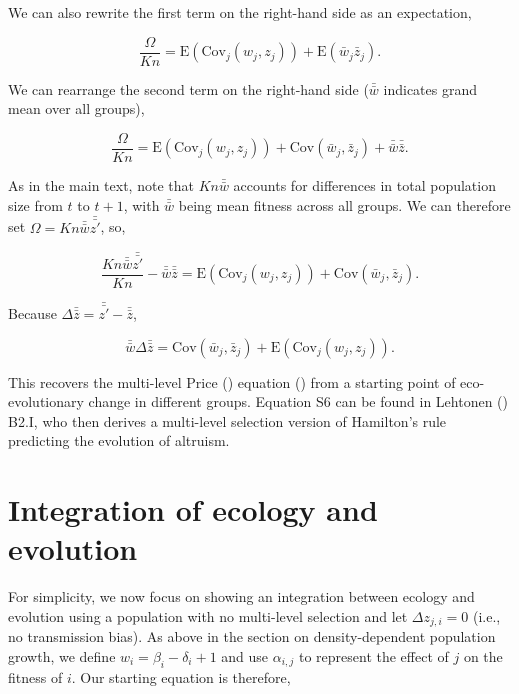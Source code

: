 \documentclass[
]{article}
\begin{document}
We can also rewrite the first term on the right-hand side as an
expectation,

\[\frac{\Omega}{K n} = \mathrm{E}\left(\mathrm{Cov}_{j}\left(w_{j}, z_{j}\right)\right) + \mathrm{E}\left(\bar{w}_{j} \bar{z}_{j} \right).\]

We can rearrange the second term on the right-hand side
(\(\bar{\bar{w}}\) indicates grand mean over all groups),

\[\frac{\Omega}{K n} = \mathrm{E}\left(\mathrm{Cov}_{j}\left(w_{j}, z_{j}\right)\right) +  \mathrm{Cov}\left(\bar{w}_{j}, \bar{z}_{j} \right) + \bar{\bar{w}}\bar{\bar{z}}.\]

As in the main text, note that \(Kn\bar{\bar{w}}\) accounts for
differences in total population size from \(t\) to \(t+1\), with
\(\bar{\bar{w}}\) being mean fitness across all groups. We can therefore
set \(\Omega = Kn\bar{\bar{w}}\bar{\bar{z'}}\), so,

\[\frac{Kn\bar{\bar{w}}\bar{\bar{z'}}}{K n} - \bar{\bar{w}}\bar{\bar{z}} = \mathrm{E}\left(\mathrm{Cov}_{j}\left(w_{j}, z_{j}\right)\right) +  \mathrm{Cov}\left(\bar{w}_{j}, \bar{z}_{j} \right).\]

Because \(\Delta \bar{\bar{z}} = \bar{\bar{z'}} - \bar{\bar{z}}\),

\[\bar{\bar{w}}\Delta \bar{\bar{z}} = \mathrm{Cov}\left(\bar{w}_{j}, \bar{z}_{j} \right) + \mathrm{E}\left(\mathrm{Cov}_{j}\left(w_{j}, z_{j}\right)\right).
\tag{S6}
\]

This recovers the multi-level Price ()
equation () from a starting
point of eco-evolutionary change in different groups. Equation S6 can be
found in Lehtonen () B2.I, who then
derives a multi-level selection version of Hamilton's rule predicting
the evolution of altruism.

\section{Integration of ecology and
evolution}\label{integration-of-ecology-and-evolution}

For simplicity, we now focus on showing an integration between ecology
and evolution using a population with no multi-level selection and let
\(\Delta z_{j, i} = 0\) (i.e., no transmission bias). As above in the
section on density-dependent population growth, we define
\(w_{i} = \beta_{i} - \delta_{i} + 1\) and use \(\alpha_{i,j}\) to
represent the effect of \(j\) on the fitness of \(i\). Our starting
equation is therefore,
\end{document}
